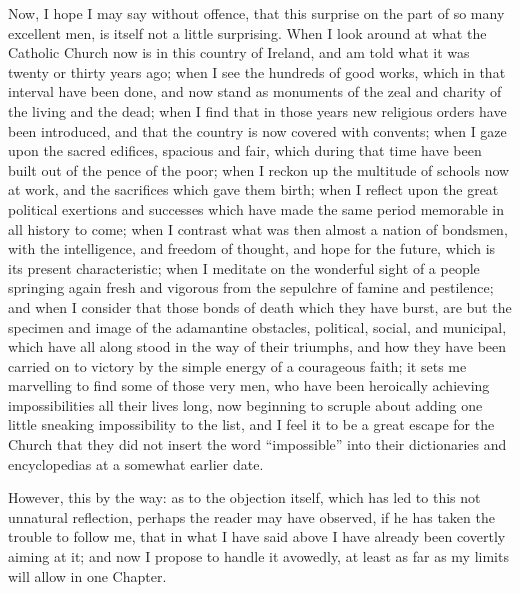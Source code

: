 Now, I hope I may say without offence, that this surprise on the
part of so many excellent men, is itself not a little surprising. When
I look around at what the Catholic Church now is in this country of
Ireland, and am told what it was twenty or thirty years ago; when I
see the hundreds of good works, which in that interval have been done,
and now stand as monuments of the zeal and charity of the living and
the dead; when I find that in those years new religious orders have
been introduced, and that the country is now covered with convents;
when I gaze upon the sacred edifices, spacious and fair, which during
that time have been built out of the pence of the poor; when I reckon
up the multitude of schools now at work, and the sacrifices which gave
them birth; when I reflect upon the great political exertions and
successes which have made the same period memorable in all history to
come; when I contrast what was then almost a nation of bondsmen,
with the intelligence, and freedom of thought, and hope for the
future, which is its present characteristic; when I meditate on the
wonderful sight of a people springing again fresh and vigorous from
the sepulchre of famine and pestilence; and when I consider that those
bonds of death which they have burst, are but the specimen and image
of the adamantine obstacles, political, social, and municipal, which
have all along stood in the way of their triumphs, and how they have
been carried on to victory by the simple energy of a courageous faith;
it sets me marvelling to find some of those very men, who have been
heroically achieving impossibilities all their lives long, now
beginning to scruple about adding one little sneaking impossibility to
the list, and I feel it to be a great escape for the Church that they
did not insert the word ``impossible'' into their dictionaries
and encyclopedias at a somewhat earlier date.

However, this by the way: as to the objection itself, which has led
to this not unnatural reflection, perhaps the reader may have
observed, if he has taken the trouble to follow me, that in what I
have said above I have already been covertly aiming at it; and now I
propose to handle it avowedly, at least as far as my limits will allow
in one Chapter.

